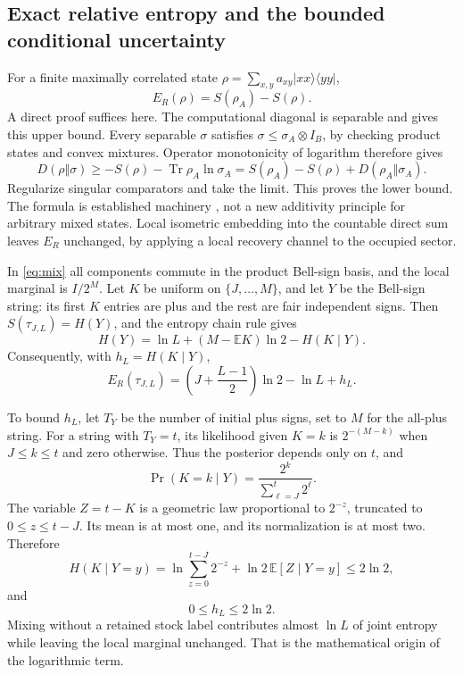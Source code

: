 \documentclass[11pt,a4paper]{article}
\numberwithin{equation}{section}
\theoremstyle{remark}
\newcommand{\tr}{\operatorname{Tr}}
\newcommand{\ER}{E_R}
\newcommand{\ket}[1]{|#1\rangle}
\newcommand{\bra}[1]{\langle#1|}
\begin{document}
\subsection{Exact relative entropy and the bounded conditional uncertainty}
For a finite maximally correlated state
\(\rho=\sum_{x,y}a_{xy}\ket{xx}\bra{yy}\),
\begin{equation}
 \ER(\rho)=S(\rho_A)-S(\rho).                    \label{eq:MC}
\end{equation}
A direct proof suffices here. The computational diagonal is separable and
gives this upper bound. Every separable \(\sigma\) satisfies
\(\sigma\leq\sigma_A\otimes I_B\), by checking product states and convex
mixtures. Operator monotonicity of logarithm therefore gives
\[
 D(\rho\Vert\sigma)\geq
 -S(\rho)-\tr\rho_A\ln\sigma_A
 =S(\rho_A)-S(\rho)+D(\rho_A\Vert\sigma_A).
\]
Regularize singular comparators and take the limit. This proves the lower
bound. The formula is established machinery \cite{ChenYang,Rains},
not a new additivity principle for arbitrary mixed states.
Local isometric embedding into the countable direct sum leaves \(\ER\)
unchanged, by applying a local recovery channel to the occupied sector.

In \eqref{eq:mix} all components commute in the product Bell-sign basis,
and the local marginal is \(I/2^M\).
Let \(K\) be uniform on \(\{J,\ldots,M\}\), and let \(Y\) be the Bell-sign
string: its first \(K\) entries are plus and the rest are fair independent
signs. Then \(S(\tau_{J,L})=H(Y)\), and the entropy chain rule gives
\[
 H(Y)=\ln L+(M-\mathbb E K)\ln2-H(K\mid Y).
\]
Consequently, with \(h_L=H(K\mid Y)\),
\begin{equation}
 \ER(\tau_{J,L})
  =\left(J+\frac{L-1}{2}\right)\ln2-\ln L+h_L.    \label{eq:mix-resource}
\end{equation}

To bound \(h_L\), let \(T_Y\) be the number of initial plus signs, set to
\(M\) for the all-plus string. For a string with \(T_Y=t\), its
likelihood given \(K=k\) is \(2^{-(M-k)}\) when \(J\leq k\leq t\)
and zero otherwise. Thus the posterior depends only on \(t\), and
\[
 \Pr(K=k\mid Y)=\frac{2^k}{\sum_{\ell=J}^t2^\ell}.
\]
The variable \(Z=t-K\) is a geometric law proportional to \(2^{-z}\),
truncated to \(0\leq z\leq t-J\). Its mean is at most one, and its
normalization is at most two. Therefore
\[
 H(K\mid Y=y)
 =\ln\sum_{z=0}^{t-J}2^{-z}+\ln2\,\mathbb E[Z\mid Y=y]
 \leq2\ln2,
\]
and
\begin{equation}
 0\leq h_L\leq2\ln2.                            \label{eq:hbound}
\end{equation}
Mixing without a retained stock label contributes almost \(\ln L\)
of joint entropy while leaving the local marginal unchanged. That is the
mathematical origin of the logarithmic term.
\end{document}
